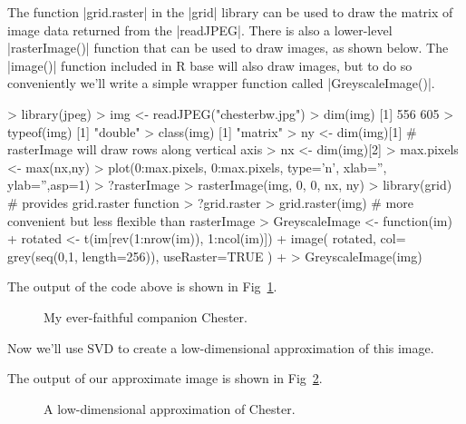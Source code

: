 The function |grid.raster| in the |grid| library can be used to draw the matrix of image data returned from the |readJPEG|.  There is also a lower-level |rasterImage()| function that can be used to draw images, as shown below. The |image()| function included in R base will also draw images, but to do so conveniently we'll write a simple wrapper function called |GreyscaleImage()|.

%
\begin{R}
> library(jpeg)
> img <- readJPEG("chesterbw.jpg")
> dim(img)
[1] 556 605
> typeof(img)
[1] "double"
> class(img)
[1] "matrix"
> ny <- dim(img)[1]  # rasterImage will draw rows along vertical axis
> nx <- dim(img)[2]
> max.pixels <- max(nx,ny)
> plot(0:max.pixels, 0:max.pixels, type='n', xlab='', ylab='',asp=1)
> ?rasterImage
> rasterImage(img, 0, 0, nx, ny)
> library(grid) # provides grid.raster function
> ?grid.raster
> grid.raster(img)  # more convenient but less flexible than rasterImage
> GreyscaleImage <- function(im){
+    rotated <- t(im[rev(1:nrow(im)), 1:ncol(im)])
+    image( rotated, col= grey(seq(0,1, length=256)), useRaster=TRUE )
+ }
> GreyscaleImage(img)
\end{R}
The output of the code above is shown in Fig~\ref{fig:chester}.
\begin{figure}[ht!]
  \caption{My ever-faithful companion Chester.\label{fig:chester}}
\end{figure}


Now we'll use SVD to create a low-dimensional approximation of this image.
%
%
The output of our approximate image is shown in Fig~\ref{fig:chester15}.
\begin{figure}[ht!]
  \caption{A low-dimensional approximation of Chester.\label{fig:chester15}}
\end{figure}


